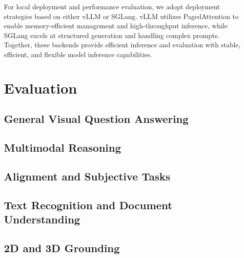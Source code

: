 \documentclass{article} %
\begin{document}
For local deployment and performance evaluation, we adopt deployment strategies based on either vLLM or SGLang. vLLM utilizes PagedAttention to enable memory-efficient management and high-throughput inference, while SGLang excels at structured generation and handling complex prompts. Together, these backends provide efficient inference and evaluation with stable, efficient, and flexible model inference capabilities.


\section{Evaluation}
\subsection{General Visual Question Answering}


\subsection{Multimodal Reasoning}





\subsection{Alignment and Subjective Tasks}


\subsection{Text Recognition and Document Understanding}


\subsection{2D and 3D Grounding}


\end{document}
